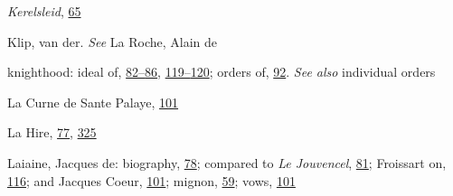 \emph{Kerelsleid},
\protect\hyperlink{10_Chapter_Three__THE_HEROIC_DREAM.xhtmlux5cux23page_65}{65}

Klip, van der. \emph{See} La Roche, Alain de

knighthood: ideal of,
\protect\hyperlink{10_Chapter_Three__THE_HEROIC_DREAM.xhtmlux5cux23page_82}{82--}\protect\hyperlink{10_Chapter_Three__THE_HEROIC_DREAM.xhtmlux5cux23page_86}{86},
\protect\hyperlink{10_Chapter_Three__THE_HEROIC_DREAM.xhtmlux5cux23page_119}{119--}\protect\hyperlink{10_Chapter_Three__THE_HEROIC_DREAM.xhtmlux5cux23page_120}{120};
orders of,
\protect\hyperlink{10_Chapter_Three__THE_HEROIC_DREAM.xhtmlux5cux23page_92}{92}.
\emph{See also} individual orders

La Curne de Sante Palaye,
\protect\hyperlink{10_Chapter_Three__THE_HEROIC_DREAM.xhtmlux5cux23page_101}{101}

La Hire,
\protect\hyperlink{10_Chapter_Three__THE_HEROIC_DREAM.xhtmlux5cux23page_77}{77},
\protect\hyperlink{20_ILLUSTRATIONS_FOLLOW_PAGE.xhtmlux5cux23page_325}{325}

Laiaine, Jacques de: biography,
\protect\hyperlink{10_Chapter_Three__THE_HEROIC_DREAM.xhtmlux5cux23page_78}{78};
compared to \emph{Le Jouvencel},
\protect\hyperlink{10_Chapter_Three__THE_HEROIC_DREAM.xhtmlux5cux23page_81}{81};
Froissart on,
\protect\hyperlink{10_Chapter_Three__THE_HEROIC_DREAM.xhtmlux5cux23page_116}{116};
and Jacques Coeur,
\protect\hyperlink{10_Chapter_Three__THE_HEROIC_DREAM.xhtmlux5cux23page_101}{101};
mignon,
\protect\hyperlink{09_Chapter_Two__THE_CRAVING_FOR_A_M.xhtmlux5cux23page_59}{59};
vows,
\protect\hyperlink{10_Chapter_Three__THE_HEROIC_DREAM.xhtmlux5cux23page_101}{101}

